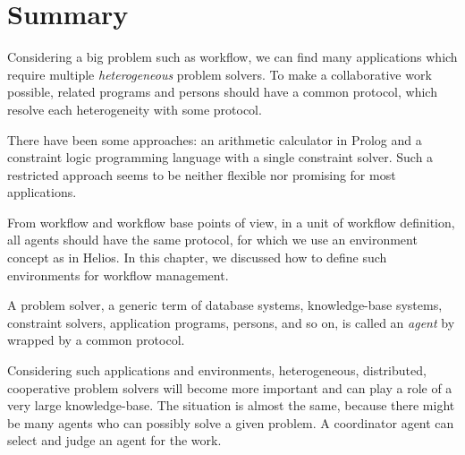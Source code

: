 \section{Summary}

Considering a big problem such as workflow, 
we can find many applications which
require multiple {\em heterogeneous} problem solvers.
To make a collaborative work possible, related programs and persons
should have a common protocol, which resolve each heterogeneity with some
protocol.

There have been some approaches: an arithmetic calculator in Prolog
and a constraint logic programming language with a single constraint
solver.  Such a restricted approach seems to be neither flexible nor
promising for most applications.

From workflow and workflow base points of view, in a unit of workflow
definition, all agents should have the same protocol, for which we
use an environment concept as in Helios.
In this chapter, we discussed how to define such environments 
for workflow management.

A problem solver, a generic term of database systems, knowledge-base
systems, constraint solvers, application programs, persons, and so on,
is called an {\em agent} by wrapped by a common protocol.

Considering such applications and environments, heterogeneous,
distributed, cooperative problem solvers will become more important
and can play a role of a very large knowledge-base.
The situation is almost the same, because there might be many agents
who can possibly solve a given problem.
A coordinator agent can select and judge an agent for the work.

%